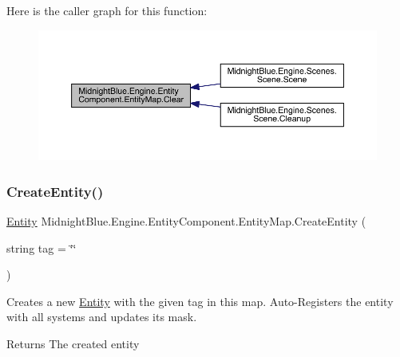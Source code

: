 Here is the caller graph for this function\+:
\nopagebreak
\begin{figure}[H]
\begin{center}
\leavevmode
\includegraphics[width=350pt]{class_midnight_blue_1_1_engine_1_1_entity_component_1_1_entity_map_af8b2220c70e42cd8e4802b744397ffcf_icgraph}
\end{center}
\end{figure}
\hypertarget{class_midnight_blue_1_1_engine_1_1_entity_component_1_1_entity_map_acb6bf0e0819a14f67678fe5d79582579}{}\label{class_midnight_blue_1_1_engine_1_1_entity_component_1_1_entity_map_acb6bf0e0819a14f67678fe5d79582579} 
\subsubsection{\texorpdfstring{Create\+Entity()}{CreateEntity()}}
{\footnotesize\ttfamily \hyperlink{class_midnight_blue_1_1_engine_1_1_entity_component_1_1_entity}{Entity} Midnight\+Blue.\+Engine.\+Entity\+Component.\+Entity\+Map.\+Create\+Entity (\begin{DoxyParamCaption}\item[{string}]{tag = {\ttfamily \char`\"{}\char`\"{}} }\end{DoxyParamCaption})\hspace{0.3cm}{\ttfamily [inline]}}



Creates a new \hyperlink{class_midnight_blue_1_1_engine_1_1_entity_component_1_1_entity}{Entity} with the given tag in this map. Auto-\/\+Registers the entity with all systems and updates its mask. 

\begin{DoxyReturn}{Returns}
The created entity
\end{DoxyReturn}

